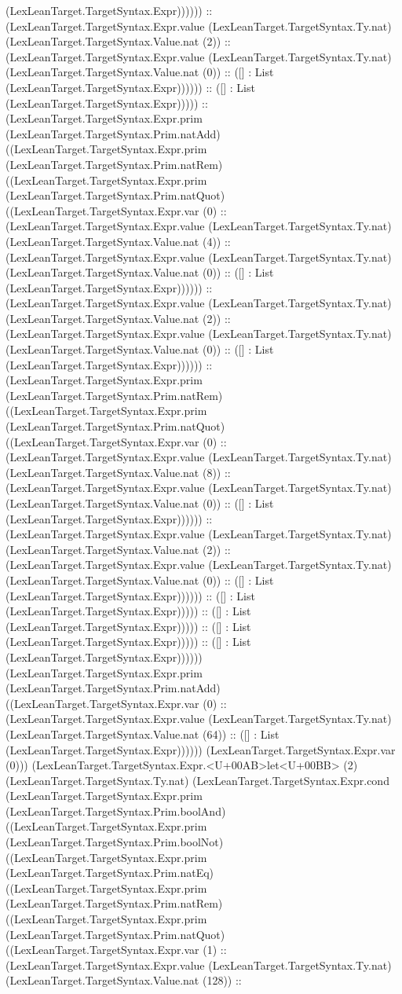 \documentclass[11pt]{article}
\begin{document}
(LexLeanTarget.TargetSyntax.Expr)))))) :: (LexLeanTarget.TargetSyntax.Expr.value (LexLeanTarget.TargetSyntax.Ty.nat) (LexLeanTarget.TargetSyntax.Value.nat (2)) :: (LexLeanTarget.TargetSyntax.Expr.value (LexLeanTarget.TargetSyntax.Ty.nat) (LexLeanTarget.TargetSyntax.Value.nat (0)) :: ([] : List (LexLeanTarget.TargetSyntax.Expr)))))) :: ([] : List (LexLeanTarget.TargetSyntax.Expr))))) :: (LexLeanTarget.TargetSyntax.Expr.prim (LexLeanTarget.TargetSyntax.Prim.natAdd) ((LexLeanTarget.TargetSyntax.Expr.prim (LexLeanTarget.TargetSyntax.Prim.natRem) ((LexLeanTarget.TargetSyntax.Expr.prim (LexLeanTarget.TargetSyntax.Prim.natQuot) ((LexLeanTarget.TargetSyntax.Expr.var (0) :: (LexLeanTarget.TargetSyntax.Expr.value (LexLeanTarget.TargetSyntax.Ty.nat) (LexLeanTarget.TargetSyntax.Value.nat (4)) :: (LexLeanTarget.TargetSyntax.Expr.value (LexLeanTarget.TargetSyntax.Ty.nat) (LexLeanTarget.TargetSyntax.Value.nat (0)) :: ([] : List (LexLeanTarget.TargetSyntax.Expr)))))) :: (LexLeanTarget.TargetSyntax.Expr.value (LexLeanTarget.TargetSyntax.Ty.nat) (LexLeanTarget.TargetSyntax.Value.nat (2)) :: (LexLeanTarget.TargetSyntax.Expr.value (LexLeanTarget.TargetSyntax.Ty.nat) (LexLeanTarget.TargetSyntax.Value.nat (0)) :: ([] : List (LexLeanTarget.TargetSyntax.Expr)))))) :: (LexLeanTarget.TargetSyntax.Expr.prim (LexLeanTarget.TargetSyntax.Prim.natRem) ((LexLeanTarget.TargetSyntax.Expr.prim (LexLeanTarget.TargetSyntax.Prim.natQuot) ((LexLeanTarget.TargetSyntax.Expr.var (0) :: (LexLeanTarget.TargetSyntax.Expr.value (LexLeanTarget.TargetSyntax.Ty.nat) (LexLeanTarget.TargetSyntax.Value.nat (8)) :: (LexLeanTarget.TargetSyntax.Expr.value (LexLeanTarget.TargetSyntax.Ty.nat) (LexLeanTarget.TargetSyntax.Value.nat (0)) :: ([] : List (LexLeanTarget.TargetSyntax.Expr)))))) :: (LexLeanTarget.TargetSyntax.Expr.value (LexLeanTarget.TargetSyntax.Ty.nat) (LexLeanTarget.TargetSyntax.Value.nat (2)) :: (LexLeanTarget.TargetSyntax.Expr.value (LexLeanTarget.TargetSyntax.Ty.nat) (LexLeanTarget.TargetSyntax.Value.nat (0)) :: ([] : List (LexLeanTarget.TargetSyntax.Expr)))))) :: ([] : List (LexLeanTarget.TargetSyntax.Expr))))) :: ([] : List (LexLeanTarget.TargetSyntax.Expr))))) :: ([] : List (LexLeanTarget.TargetSyntax.Expr))))) :: ([] : List (LexLeanTarget.TargetSyntax.Expr)))))) (LexLeanTarget.TargetSyntax.Expr.prim (LexLeanTarget.TargetSyntax.Prim.natAdd) ((LexLeanTarget.TargetSyntax.Expr.var (0) :: (LexLeanTarget.TargetSyntax.Expr.value (LexLeanTarget.TargetSyntax.Ty.nat) (LexLeanTarget.TargetSyntax.Value.nat (64)) :: ([] : List (LexLeanTarget.TargetSyntax.Expr)))))) (LexLeanTarget.TargetSyntax.Expr.var (0))) (LexLeanTarget.TargetSyntax.Expr.<U+00AB>let<U+00BB> (2) (LexLeanTarget.TargetSyntax.Ty.nat) (LexLeanTarget.TargetSyntax.Expr.cond (LexLeanTarget.TargetSyntax.Expr.prim (LexLeanTarget.TargetSyntax.Prim.boolAnd) ((LexLeanTarget.TargetSyntax.Expr.prim (LexLeanTarget.TargetSyntax.Prim.boolNot) ((LexLeanTarget.TargetSyntax.Expr.prim (LexLeanTarget.TargetSyntax.Prim.natEq) ((LexLeanTarget.TargetSyntax.Expr.prim (LexLeanTarget.TargetSyntax.Prim.natRem) ((LexLeanTarget.TargetSyntax.Expr.prim (LexLeanTarget.TargetSyntax.Prim.natQuot) ((LexLeanTarget.TargetSyntax.Expr.var (1) :: (LexLeanTarget.TargetSyntax.Expr.value (LexLeanTarget.TargetSyntax.Ty.nat) (LexLeanTarget.TargetSyntax.Value.nat (128)) :: 
\end{document}
